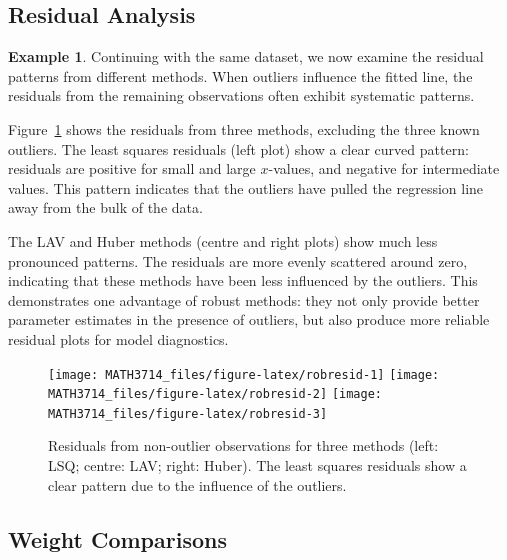 \documentclass[
  a4paper,
]{article}
\theoremstyle{definition}
\theoremstyle{definition}
\newtheorem{example}{Example}[section]
\theoremstyle{definition}
\theoremstyle{definition}
\theoremstyle{remark}
\begin{document}
\subsection{Residual Analysis}\label{residual-analysis}

\begin{example}

Continuing with the same dataset, we now examine the residual patterns
from different methods. When outliers influence the fitted line, the
residuals from the remaining observations often exhibit systematic patterns.

Figure~\ref{fig:robresid} shows the residuals from three methods,
excluding the three known outliers. The least squares residuals (left plot)
show a clear curved pattern: residuals are positive for small and large
\(x\)-values, and negative for intermediate values. This pattern indicates
that the outliers have pulled the regression line away from the bulk of
the data.

The LAV and Huber methods (centre and right plots) show much less
pronounced patterns. The residuals are more evenly scattered around
zero, indicating that these methods have been less influenced by the
outliers. This demonstrates one advantage of robust methods: they
not only provide better parameter estimates in the presence of outliers,
but also produce more reliable residual plots for model diagnostics.

\begin{figure}
\texttt{[image: MATH3714\_files/figure-latex/robresid-1]} \texttt{[image: MATH3714\_files/figure-latex/robresid-2]} \texttt{[image: MATH3714\_files/figure-latex/robresid-3]} \caption{Residuals from non-outlier observations for three methods (left: LSQ; centre: LAV; right: Huber). The least squares residuals show a clear pattern due to the influence of the outliers.}\label{fig:robresid}
\end{figure}

\end{example}

\subsection{Weight Comparisons}\label{weight-comparisons}
\end{document}
